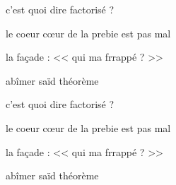 \documentclass[addpoints]{exam}
\begin{document}
	
	
\begin{tcolorbox}[title=Exercice 1]
	\begin{questions}
		\question[1] c'est quoi dire factorisé ?

		le coeur c{\oe}ur de la prebie est pas mal 

		la façade : << qui ma frrappé ? >>

		abîmer saïd théorème
	\end{questions}
\end{tcolorbox}

	
\begin{tcolorbox}[title=Exercice 2]
	\begin{questions}
		\question[1] c'est quoi dire factorisé ?

		le coeur c{\oe}ur de la prebie est pas mal 

		la façade : << qui ma frrappé ? >>

		abîmer saïd théorème
	\end{questions}
\end{tcolorbox}
	
\end{document}
